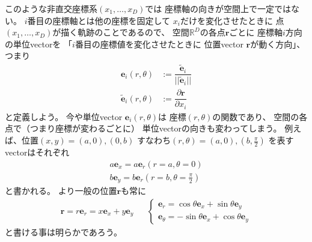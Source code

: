 このような非直交座標系$(x_1,\dots,x_D)$では
座標軸の向きが空間上で一定ではない。
$i$番目の座標軸とは他の座標を固定して
$x_i$だけを変化させたときに
点$(x_1,\dots,x_D)$が描く軌跡のことであるので、
空間$\mathbb{R}^D$の各点$\bm{r}$ごとに
座標軸$i$方向の単位vectorを
「$i$番目の座標値を変化させたときに
位置vector $\bm{r}$が動く方向」、つまり
\begin{subequations}
\begin{align}
  \bm{e}_i (r, \theta)
  &:=
  \dfrac{ \tilde{\bm{e}}_i }
  { \big|\big| \tilde{\bm{e}}_i \big|\big| }
\\
  \tilde{\bm{e}}_i (r, \theta)
  &:=
  \dfrac{\partial \bm{r}}{\partial x_i}
\end{align}
\end{subequations}
と定義しよう。
今や単位vector $\bm{e}_i (r, \theta)$は
座標$(r, \theta)$の関数であり、
空間の各点で（つまり座標が変わるごとに）
単位vectorの向きも変わってしまう。
例えば、位置$(x, y) = (a,0), (0,b)$
すなわち$(r, \theta) = (a, 0), (b, \frac{\pi}{2})$
を表すvectorはそれぞれ
\begin{subequations}
\begin{align}
  a \bm{e}_x
  = a \bm{e}_r (r=a, \theta = 0)
\\
  b \bm{e}_y
  = b \bm{e}_r (r=b, \theta = \frac{\pi}{2})
\end{align}
\end{subequations}
と書かれる。
より一般の位置$\bm{r}$も常に
\begin{align}
  \bm{r} = r \bm{e}_r
  = x \bm{e}_x + y \bm{e}_y
  &&
  \begin{cases}
    \bm{e}_r
  =
    \cos \theta \bm{e}_x
  +
    \sin \theta \bm{e}_y
  \\
    \bm{e}_\theta
  =
    - \sin \theta \bm{e}_x
  +
    \cos \theta \bm{e}_y
  \end{cases}
\end{align}
と書ける事は明らかであろう。

